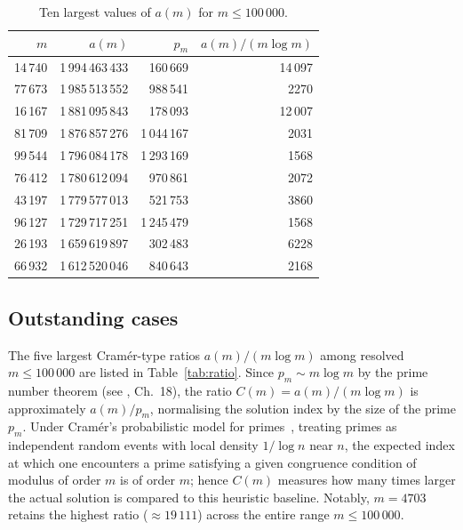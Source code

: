 \documentclass[12pt]{article}
\begin{document}
	\begin{table}[ht]
		\centering
		\caption{Ten largest values of $a(m)$ for $m \leq 100\,000$.}
		\label{tab:top10}
		\begin{tabular}{rrrr}
			\toprule
			$m$ & $a(m)$ & $p_m$ & $a(m)/(m \log m)$ \\
			\midrule
			14\,740 & 1\,994\,463\,433 &  160\,669 & 14\,097 \\
			77\,673 & 1\,985\,513\,552 &  988\,541 &  2270 \\
			16\,167 & 1\,881\,095\,843 &  178\,093 & 12\,007 \\
			81\,709 & 1\,876\,857\,276 & 1\,044\,167 &  2031 \\
			99\,544 & 1\,796\,084\,178 & 1\,293\,169 &  1568 \\
			76\,412 & 1\,780\,612\,094 &  970\,861 &  2072 \\
			43\,197 & 1\,779\,577\,013 &  521\,753 &  3860 \\
			96\,127 & 1\,729\,717\,251 & 1\,245\,479 &  1568 \\
			26\,193 & 1\,659\,619\,897 &  302\,483 &  6228 \\
			66\,932 & 1\,612\,520\,046 &  840\,643 &  2168 \\
			\bottomrule
		\end{tabular}
	\end{table}
	
	\subsection{Outstanding cases}
	
	The five largest Cram\'er-type ratios $a(m)/(m\log m)$ among resolved
	$m \leq 100\,000$ are listed in Table~\ref{tab:ratio}.
	Since $p_m \sim m\log m$ by the prime number theorem
	(see \cite{Davenport}, Ch.~18), the ratio
	$C(m) = a(m)/(m\log m)$ is approximately $a(m)/p_m$, normalising the
	solution index by the size of the prime $p_m$.
	Under Cram\'er's probabilistic model for primes~\cite{Cramer1936},
	treating primes as independent random events with local density
	$1/\log n$ near $n$, the expected index at which one encounters a prime
	satisfying a given congruence condition of modulus of order $m$ is of
	order $m$; hence $C(m)$ measures how many times larger the actual
	solution is compared to this heuristic baseline.
	Notably, $m = 4703$ retains the highest ratio ($\approx 19\,111$)
	across the entire range $m \leq 100\,000$.
	
\end{document}
